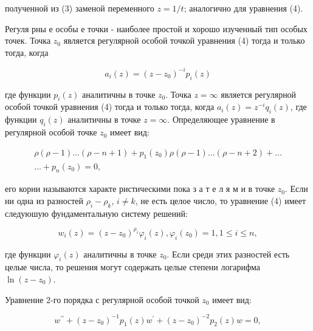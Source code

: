 \documentclass[10pt]{article}
\begin{document}
полученной из (3) заменой переменного $z=1 / t$; аналогично для уравнения (4).



Регуля рны е особы е точки - наиболее простой и хорошо изученный тип особых точек. Точка $z_{0}$ является регулярной особой точкой уравнения (4) тогда и только тогда, когда



\[

a_{i}(z)=\left(z-z_{0}\right)^{-i} p_{i}(z)

\]



где функции $p_{i}(z)$ аналитичны в точке $z_{0}$. Точка $z=\infty$ является регулярной особой точкой уравнения (4) тогда и только тогда, когда $a_{i}(z)=z^{-i} q_{i}(z)$, где функции $q_{i}(z)$ аналитичны в точке $z=\infty$. Определяющее уравнение в регулярной особой точке $z_{0}$ имеет вид:



\[

\begin{gathered}

\rho(\rho-1) \ldots(\rho-n+1)+p_{1}\left(z_{0}\right) \rho(\rho-1) \ldots(\rho-n+2)+\ldots \\

\ldots+p_{n}\left(z_{0}\right)=0,

\end{gathered}

\]



его корни называются характе ристическими пока з а т е л я м и в точке $z_{0}$. Если ни одна из разностей $\rho_{i}-\rho_{k}$, $i \neq k$, не есть целое число, то уравнение (4) имеет следуюшую фундаментальную систему решений:



\[

w_{i}(z)=\left(z-z_{0}\right)^{\rho_{i}} \varphi_{i}(z), \varphi_{i}\left(z_{0}\right)=1,1 \leqslant i \leqslant n,

\]



где функции $\varphi_{i}(z)$ аналитичны в точке $z_{0}$. Если среди этих разностей есть целые числа, то решения могут содержать целые степени логарифма $\ln \left(z-z_{0}\right)$.



Уравнение 2-го порядка с регулярной особой точкой $z_{0}$ имеет вид:



\[

w^{\prime \prime}+\left(z-z_{0}\right)^{-1} p_{1}(z) w^{\prime}+\left(z-z_{0}\right)^{-2} p_{2}(z) w=0,

\]
\end{document}
